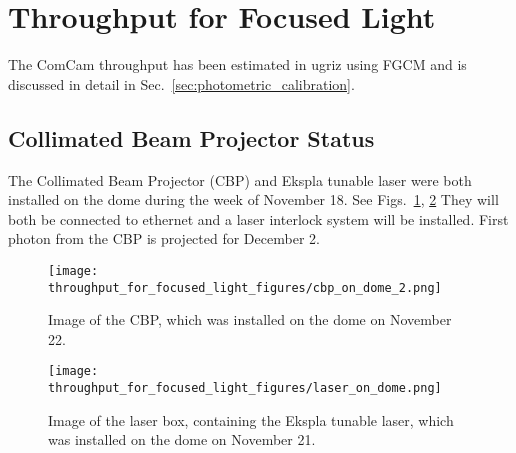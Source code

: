 \section{Throughput for Focused Light}
\label{sec:throughout_for_focused_light}

The ComCam throughput has been estimated in ugriz using FGCM and is discussed in detail in Sec.~\ref{sec:photometric_calibration}.

\subsection{Collimated Beam Projector Status}

The Collimated Beam Projector (CBP) and Ekspla tunable laser were both installed on the dome during the week
of November 18. See Figs.~\iffalse\ref{fig:cbp_1},\fi \ref{fig:cbp_2}, \ref{fig:laser} They will both be connected to ethernet and a laser interlock system will be installed. First photon from the CBP is projected for December 2.

\iffalse
\begin{figure}[htbp]
  \texttt{[image: throughput\_for\_focused\_light\_figures/cbp\_on\_dome\_1.png]}
  \caption{Image of the CBP, which was installed on the dome on November 22.}
  \label{fig:cbp_1}
\end{figure}
\fi
  
\begin{figure}[htbp]
  \begin{center}
    \texttt{[image: throughput\_for\_focused\_light\_figures/cbp\_on\_dome\_2.png]}
  \end{center}
  \caption{Image of the CBP, which was installed on the dome on November 22.}
  \label{fig:cbp_2}
\end{figure}
  
\begin{figure}[htbp]
  \texttt{[image: throughput\_for\_focused\_light\_figures/laser\_on\_dome.png]}
  \caption{Image of the laser box, containing the Ekspla tunable laser, which was installed on the dome on November 21.}
  \label{fig:laser}
\end{figure}